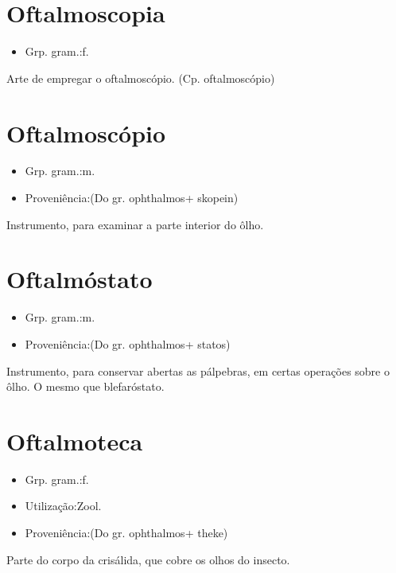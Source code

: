 \section{Oftalmoscopia}
\begin{itemize}
\item {Grp. gram.:f.}
\end{itemize}
Arte de empregar o oftalmoscópio.
(Cp. \textunderscore oftalmoscópio\textunderscore )
\section{Oftalmoscópio}
\begin{itemize}
\item {Grp. gram.:m.}
\end{itemize}
\begin{itemize}
\item {Proveniência:(Do gr. \textunderscore ophthalmos\textunderscore  + \textunderscore skopein\textunderscore )}
\end{itemize}
Instrumento, para examinar a parte interior do ôlho.
\section{Oftalmóstato}
\begin{itemize}
\item {Grp. gram.:m.}
\end{itemize}
\begin{itemize}
\item {Proveniência:(Do gr. \textunderscore ophthalmos\textunderscore  + \textunderscore statos\textunderscore )}
\end{itemize}
Instrumento, para conservar abertas as pálpebras, em certas operações sobre o ôlho.
O mesmo que \textunderscore blefaróstato\textunderscore .
\section{Oftalmoteca}
\begin{itemize}
\item {Grp. gram.:f.}
\end{itemize}
\begin{itemize}
\item {Utilização:Zool.}
\end{itemize}
\begin{itemize}
\item {Proveniência:(Do gr. \textunderscore ophthalmos\textunderscore  + \textunderscore theke\textunderscore )}
\end{itemize}
Parte do corpo da crisálida, que cobre os olhos do insecto.
